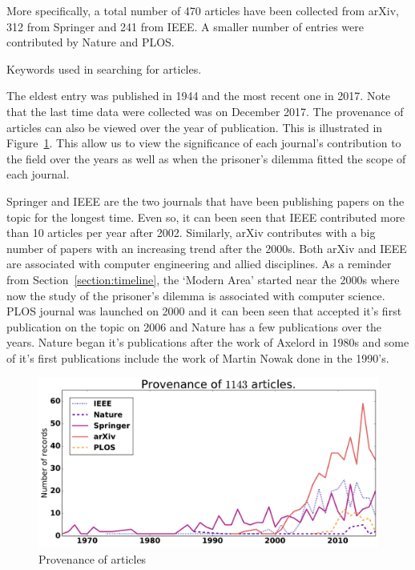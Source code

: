 \documentclass{article}
\begin{document}
More specifically, a total number of 470 articles have been collected from arXiv,
312 from Springer and 241 from IEEE. A smaller number of entries were
contributed by Nature and PLOS.

\begin{table}[!hbtp]
    \begin{center}
    
    \end{center}
    \caption{Keywords used in searching for articles.}
    \label{table:provenance}
\end{table}

The eldest entry was published in 1944 and the most recent one in 2017. Note
that the last time data were collected was on December 2017. The provenance of
articles can also be viewed over the year of publication. This is illustrated
in Figure~\ref{fig:provenance}. This allow us to view the significance of each
journal's contribution to the field over the years as well as when the prisoner's
dilemma fitted the scope of each journal. 

Springer and IEEE are the two journals that have been publishing papers on the 
topic for the longest time. Even so, it can been seen that IEEE contributed more
than 10 articles per year after 2002. Similarly, arXiv contributes with a big
number of papers with an increasing trend after the 2000s. Both arXiv and IEEE
are associated with computer engineering and allied disciplines. As a reminder
from Section~\ref{section:timeline}, the `Modern Area' started near the 2000s
where now the study of the prisoner's dilemma is associated with computer science.
PLOS journal was launched on 2000 and it can been seen that accepted it's first
publication on the topic on 2006 and Nature has a few publications over the
years. Nature began it's publications after the work of Axelord in 1980s and
some of it's first publications include the work of Martin Nowak done in the 
1990's.

\begin{figure}[!hbtp]
    \centering
    \includegraphics[width=.6\textwidth]{./assets/images/provenance.pdf}
    \caption{Provenance of articles}
    \label{fig:provenance}
\end{figure}
\end{document}
